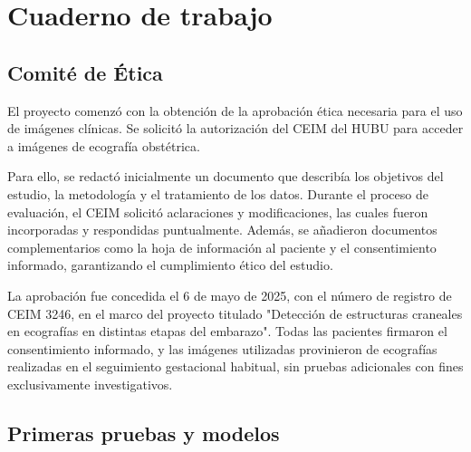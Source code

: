 


\section{Cuaderno de trabajo}

\subsection{Comité de Ética}
El proyecto comenzó con la obtención de la aprobación ética necesaria para el uso de imágenes clínicas. Se solicitó la autorización del CEIM del HUBU para acceder a imágenes de ecografía obstétrica. 

Para ello, se redactó inicialmente un documento que describía los objetivos del estudio, la metodología y el tratamiento de los datos. Durante el proceso de evaluación, el CEIM solicitó aclaraciones y modificaciones, las cuales fueron incorporadas y respondidas puntualmente. Además, se añadieron documentos complementarios como la hoja de información al paciente y el consentimiento informado, garantizando el cumplimiento ético del estudio.

La aprobación fue concedida el 6 de mayo de 2025, con el número de registro de CEIM 3246, en el marco del proyecto titulado "Detección de estructuras craneales en ecografías en distintas etapas del embarazo". Todas las pacientes firmaron el consentimiento informado, y las imágenes utilizadas provinieron de ecografías realizadas en el seguimiento gestacional habitual, sin pruebas adicionales con fines exclusivamente investigativos.

\subsection{Primeras pruebas y modelos}

